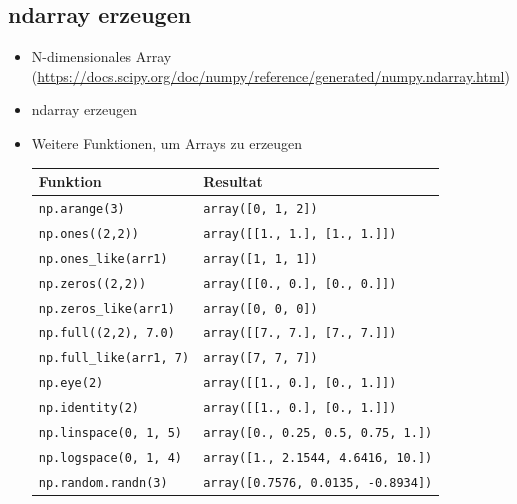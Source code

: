 \subsection{ndarray erzeugen}
\begin{itemize}
	\item N-dimensionales Array (\url{https://docs.scipy.org/doc/numpy/reference/generated/numpy.ndarray.html})
	\item ndarray erzeugen\\
	
	\item Weitere Funktionen, um Arrays zu erzeugen\\
	\begin{tabular}{|l|l|}
		\hline 
		\textbf{Funktion} &\textbf{Resultat}\\ 
		\hline 
		\texttt{np.arange(3)} &\texttt{array([0, 1, 2])}\\ 
		\texttt{np.ones((2,2))} &\texttt{array([[1., 1.], [1., 1.]])}\\ 
		\texttt{np.ones\_like(arr1)} &\texttt{array([1, 1, 1])}\\ 
		\texttt{np.zeros((2,2))} &\texttt{array([[0., 0.], [0., 0.]])}\\ 
		\texttt{np.zeros\_like(arr1)} &\texttt{array([0, 0, 0])}\\ 
		\texttt{np.full((2,2), 7.0)} &\texttt{array([[7., 7.], [7., 7.]])}\\ 
		\texttt{np.full\_like(arr1, 7)} &\texttt{array([7, 7, 7])}\\ 
		\texttt{np.eye(2)} &\texttt{array([[1., 0.], [0., 1.]])}\\ 
		\texttt{np.identity(2)} &\texttt{array([[1., 0.], [0., 1.]])}\\ 
		\texttt{np.linspace(0, 1, 5)} &\texttt{array([0., 0.25, 0.5, 0.75, 1.])}\\ 
		\texttt{np.logspace(0, 1, 4)} &\texttt{array([1., 2.1544, 4.6416, 10.])}\\ 
		\texttt{np.random.randn(3)} &\texttt{array([0.7576, 0.0135, -0.8934])}\\ 
		\hline 
	\end{tabular} 
\end{itemize}

